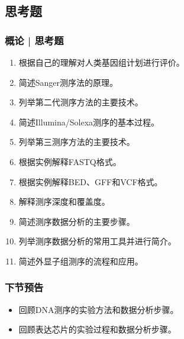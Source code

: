 \subsection{思考题}
\begin{frame}
  \frametitle{概论 | 思考题}
  \begin{enumerate}
    \item 根据自己的理解对人类基因组计划进行评价。
    \item 简述Sanger测序法的原理。
    \item 列举第二代测序方法的主要技术。
    \item 简述Illumina/Solexa测序的基本过程。
    \item 列举第三测序方法的主要技术。
    \item 根据实例解释FASTQ格式。
    \item 根据实例解释BED、GFF和VCF格式。
    \item 解释测序深度和覆盖度。
    \item 简述测序数据分析的主要步骤。
    \item 列举测序数据分析的常用工具并进行简介。
    \item 简述外显子组测序的流程和应用。
  \end{enumerate}
\end{frame}

\begin{frame}
  \frametitle{下节预告}
  \begin{itemize}
    \item 回顾DNA测序的实验方法和数据分析步骤。
    \item 回顾表达芯片的实验过程和数据分析步骤。
  \end{itemize}
\end{frame}




